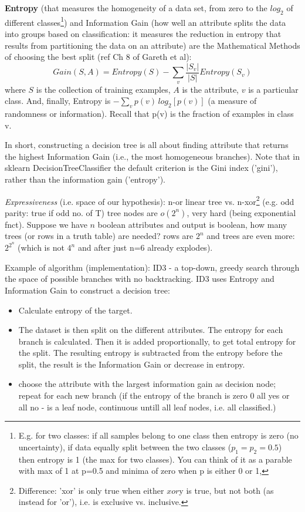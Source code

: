 \documentclass[11pt]{article}
\begin{document}
\textbf{Entropy} (that measures the homogeneity of a data set, from zero to the $log_2$ of different classes\footnote{E.g. for two classes: if all samples belong to one class then entropy is zero (no uncertainty), if data equally split between the two classes ($p_1 = p_2 = 0.5$) then entropy is 1 (the max for two classes). You can think of it as a parable with max of 1 at p=0.5 and minima of zero when p is either 0 or 1,}) and Information Gain (how well an attribute splits the data into groups based on classification: it measures the reduction in entropy that results from partitioning the data on an attribute) are the Mathematical Methods of choosing the best split (ref Ch 8 of Gareth et al):
\[ Gain(S, A) = Entropy(S) - \sum_v \frac{|S_v|}{|S|} Entropy(S_v)
\]
where $S$ is the collection of training examples, $A$ is the attribute, $v$ is a particular class. And, finally, Entropy is $-\sum_v p(v) \,log_2[p(v)]$ (a measure of randomness or information). Recall that p(v) is the fraction of examples in class v. 

In short, constructing a decision tree is all about finding attribute that returns the highest Information Gain (i.e., the most homogeneous branches). Note that in sklearn DecisionTreeClassifier the default criterion is the Gini index ('gini'), rather than the information gain ('entropy').  

\textit{Expressiveness} (i.e. space of our hypothesis): n-or linear tree vs. n-xor\footnote{Difference: 'xor' is only true when either $x or $y is true, but not both (as instead for 'or'), i.e. is exclusive vs. inclusive.} (e.g. odd parity: true if odd no. of T) tree nodes are $o(2^n)$, very hard (being exponential fnct). 
Suppose we have $n$ boolean attributes and output is boolean, how many trees (or rows in a truth table) are needed? rows are $2^n$ and trees are even more: $2^{2^n}$ (which is not $4^n$ and after just n=6 already explodes). 

Example of algorithm (implementation): ID3 - a top-down, greedy search through the space of possible branches with no backtracking. ID3 uses Entropy and Information Gain to construct a decision tree:
\begin{itemize}
	\item Calculate entropy of the target.
	\item The dataset is then split on the different attributes. The entropy for each branch is calculated. Then it is added proportionally, to get total entropy for the split. The resulting entropy is subtracted from the entropy before the split, the result is the Information Gain or decrease in entropy. 
	\item choose the attribute with the largest information gain as decision node; repeat for each new branch (if the entropy of the branch is zero 0 all yes or all no -  is a leaf node, continuous untill all leaf nodes, i.e. all classified.)
\end{itemize}
\end{document}
